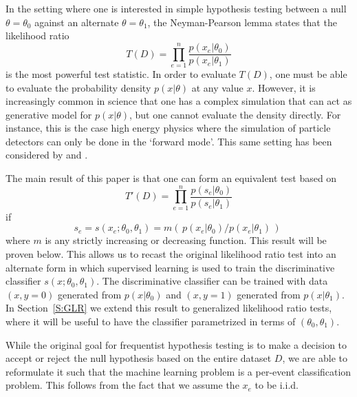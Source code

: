 \documentclass[11pt, oneside]{article}   	%
\begin{document}
In the setting where one is interested in simple hypothesis testing between a null $\theta=\theta_0$ against an alternate $\theta=\theta_1$, the Neyman-Pearson lemma states that the likelihood ratio 
\begin{equation}
T(D) = \prod_{e=1}^n \frac{ p(x_e|\theta_0)}{ p(x_e|\theta_1)}
\end{equation}
is the most powerful test statistic. In order to evaluate $T(D)$, one must be able to evaluate the probability density 
$p(x| \theta)$ at any value $x$. However, it is increasingly common in science that one has a complex simulation that 
can act as generative model  for $p(x|\theta)$, but one cannot evaluate the density directly. For instance, this is the case 
high energy physics where the simulation of particle detectors can only be done in the `forward mode'. This same setting has been considered by \cite{ClaytonScott} and \cite{JMLR:v14:tong13a}.

The main result of this paper is that one can form an equivalent test based on 
\begin{equation}\label{eq:equivLRtest}
T'(D) = \prod_{e=1}^n \frac{ p(s_e | \theta_0)}{ p(s_e | \theta_1)}
\end{equation}
if 
\begin{equation}\label{eq:montonic}
s_e = s(x_e; \theta_0, \theta_1) = m\left(\, p(x_e|\theta_0) / p(x_e|\theta_1) \,\right) \; 
\end{equation}
where $m$ is any strictly increasing or decreasing function. This result will be proven below.
This allows us to recast the original likelihood ratio test into an alternate form in which supervised learning is used to train the discriminative classifier $s(x; \theta_0, \theta_1)$. The discriminative classifier can be trained with data $(x,y=0)$ generated 
from $p(x|\theta_0)$ and $(x,y=1)$ generated from $p(x|\theta_1)$. In Section~\ref{S:GLR} we extend this result to generalized likelihood ratio tests, where it will be useful to have the classifier  parametrized in terms of $(\theta_0, \theta_1)$.

While the original goal for frequentist hypothesis testing is to make a decision to accept or reject the null hypothesis based on the entire dataset $D$, we are able to reformulate it such that the machine learning problem is a per-event classification problem. This follows from the fact that we assume the $x_e$ to be i.i.d.
\end{document}
